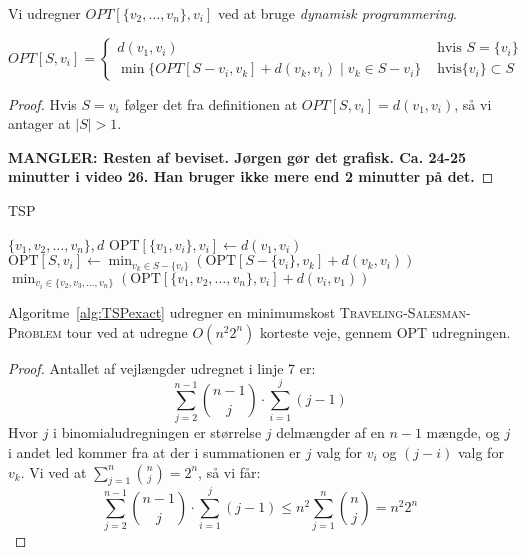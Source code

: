 Vi udregner $OPT[\{v_{2}, \ldots, v_{n}\}, v_{i}]$ ved at bruge \textit{dynamisk programmering}.

\begin{lemma}
	\begin{equation*}
		OPT[S, v_{i}] =
		\begin{cases}
			d(v_{1}, v_{i})                                                      & \text{ hvis } S=\{v_{i}\}        \\
			\min\{OPT[S-{v_{i}},v_{k}]+d(v_{k},v_{i}) \mid v_{k} \in S-{v_{i}}\} & \text{ hvis} \{v_{i}\} \subset S
		\end{cases}
	\end{equation*}
\end{lemma}

\begin{proof}
	Hvis $S = v_{i}$ følger det fra definitionen at $OPT[S, v_{i}] = d(v_{1},v_{i})$, så vi antager at $|S| > 1$.

	\textbf{MANGLER: Resten af beviset. Jørgen gør det grafisk. Ca. 24-25 minutter i video 26. Han bruger ikke mere end 2 minutter på det.}
\end{proof}

\begin{algorithm}
	\caption{\label{alg:TSPexact} TSP}
	\begin{algorithmic}[1]
		\REQUIRE $\{v_1, v_2, \ldots, v_n\}, d$
		\STATE $\text{OPT}[\{v_1, v_i\}, v_i] \leftarrow d(v_1, v_i)$
		\ENDFOR
		\STATE $\text{OPT}[S, v_i] \leftarrow \min_{v_k \in S - \{v_i\}} (\text{OPT}[S - \{v_i\}, v_k] + d(v_k, v_i))$
		\ENDFOR
		\ENDFOR
		\ENDFOR
		\RETURN $\min_{v_i \in \{v_2, v_3, \ldots, v_n\}} (\text{OPT}[\{v_1, v_2, \ldots, v_n\}, v_i] + d(v_i, v_1))$
	\end{algorithmic}
\end{algorithm}

\begin{lemma}
	Algoritme~\ref{alg:TSPexact} udregner en minimumskost \textsc{Traveling-Salesman-Problem} tour ved at udregne $O(n^{2}2^{n})$ korteste veje, gennem OPT udregningen.
\end{lemma}
\begin{proof}
	Antallet af vejlængder udregnet i linje 7 er:
	\begin{equation*}
		\sum_{j=2}^{n-1}  \binom{n-1}{j} \cdot \sum_{i=1}^j (j-1)
	\end{equation*}
	Hvor $j$ i binomialudregningen er størrelse $j$ delmængder af en $n-1$ mængde, og $j$ i andet led kommer fra at der i summationen er $j$ valg for $v_{i}$ og $(j-i)$ valg for $v_{k}$. Vi ved at $\sum_{j=1}^n \binom{n}{j} = 2^{n}$, så vi får:
	\begin{equation*}
		\sum_{j=2}^{n-1} \binom{n-1}{j} \cdot \sum_{i=1}^j (j-1) \le n^{2} \sum_{j=1}^n \binom{n}{j} = n^{2} 2^{n}
	\end{equation*}
\end{proof}

